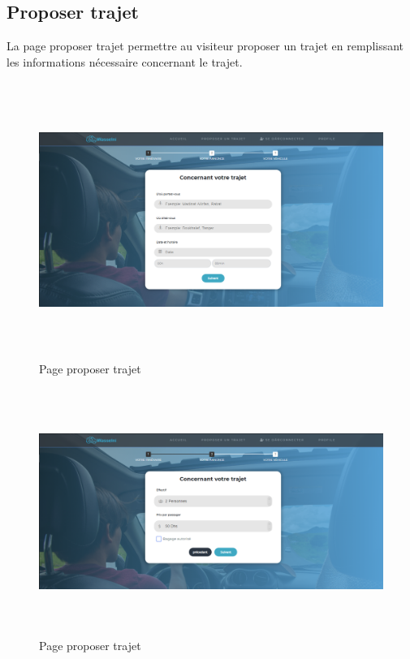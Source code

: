 \documentclass[a4paper]{report}
\begin{document}
\begin{spacing}{2}
\subsection{Proposer trajet}
La page proposer trajet permettre au visiteur proposer un trajet en remplissant les informations nécessaire concernant le trajet.\\ 
\begin{figure}[!ht]
\begin{center}
\includegraphics[height=9cm]{propo1.png}
\end{center}
\caption[Page proposer trajet]{Page proposer trajet}
\end{figure}
\begin{figure}[!ht]
\begin{center}
\includegraphics[height=8cm]{propo2.png}
\end{center}
\caption[Page proposer trajet]{Page proposer trajet}
\end{figure}

\end{spacing}
\end{document}
